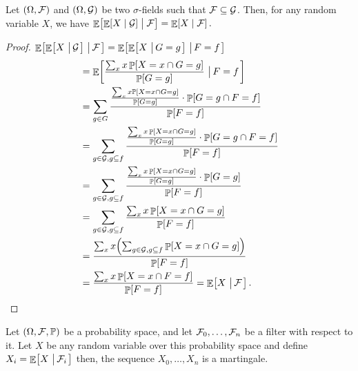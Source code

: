 \begin{lemma}
    Let $(\Omega, \mathcal{F})$ and $(\Omega, \mathcal{G})$ be two
    $\sigma$-fields such that $\mathcal{F} \subseteq \mathcal{G}$. Then, for
    any random variable $X$, we have
    \begin{math}
        \ExCond{ \ExCond{X}{ \FamilyB}}{ \Family \bigr. } %
        =%
        \ExCond{ X}{ \Family }.
    \end{math}
\end{lemma}

\begin{proof}
    $\displaystyle \mathop{\mathbb{E}}\!\left[ { \mathop{\mathbb{E}}\!\left[ {X \,\left|\, { \mathcal{G}} \bigr.\right.} \right] \,\left|\, { \mathcal{F} } \bigr.\right.} \right] =  \mathop{\mathbb{E}}\!\left[ { \mathop{\mathbb{E}}\!\left[ {X
          \,\left|\, { G = g} \bigr.\right.} \right] \,\left|\, { F = f } \bigr.\right.} \right]$
    \begin{align*}
      &=%
        \Ex{ \frac{\sum_{x} x \Prob{X =x \cap G = g}}{\Prob{G=g}}
        \sep{F =f }}%
     \\&
     =%
        \sum_{g \in G} \frac{\frac{\sum_x {x} \ProbLTR [X =x \cap G =
        g]}{\Prob{G=g}} \cdot \Prob{ G = g \cap F = f
        }}{\Prob{F = f}} \\%
      &=%
        \sum_{g \in \FamilyB, g \subseteq f} \frac{\frac{\sum_x x
        \Prob{X =x \cap G = g}}{\Prob{G=g}} \cdot \Prob{ G = g
        \cap F = f }}{\Prob{F = f}} %
  \\&
  =%
        \sum_{g \in \FamilyB, g \subseteq f} \frac{\frac{\sum_x x
        \Prob{X =x \cap G = g}}{\Prob{G=g}} \cdot \Prob{ G = g
        }}{\Prob{F = f}} \\%
      &=%
        \sum_{g \in \FamilyB, g \subseteq f} \frac{\sum_x x \Prob{X =x
              \cap G = g}}{\Prob{F = f}}
        \\&
        =%
        \frac{\sum_x x \pth{ \sum_{g \in \FamilyB, g \subseteq f}
        \Prob{X =x \cap G = g}}}{\Prob{F = f}} \\
      &=%
        \frac{\sum_x x \Prob{ X =x \cap F =f }}{\Prob{F = f}} =%
        \Ex{ X \sep{ \Family}}.
    \end{align*}
\end{proof}


\begin{theorem}
    Let $(\Omega, \mathcal{F}, \mathbb{P})$ be a probability space, and let
    $\mathcal{F}_0, \ldots, \mathcal{F}_n$ be a filter with respect to it. Let
    $X$ be any random variable over this probability space and define
    $X_i = \mathop{\mathbb{E}}\!\left[ {X \,\left|\, { \mathcal{F}_i} \bigr.\right.} \right]$ then, the sequence $X_0, \ldots,
    X_n$ is a martingale.
\end{theorem}

